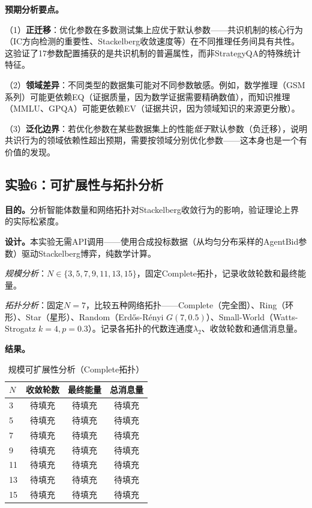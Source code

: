 \documentclass[12pt,a4paper,UTF8,fontset=fandol]{ctexart}
\begin{document}
\textbf{预期分析要点。}

（1）\textbf{正迁移}：优化参数在多数测试集上应优于默认参数——共识机制的核心行为（IC方向检测的重要性、Stackelberg收敛速度等）在不同推理任务间具有共性。这验证了17参数配置捕获的是共识机制的普遍属性，而非StrategyQA的特殊统计特征。

（2）\textbf{领域差异}：不同类型的数据集可能对不同参数敏感。例如，数学推理（GSM系列）可能更依赖EQ（证据质量，因为数学证据需要精确数值），而知识推理（MMLU、GPQA）可能更依赖EV（证据共识，因为领域知识的来源更分散）。

（3）\textbf{泛化边界}：若优化参数在某些数据集上的性能\textit{低于}默认参数（负迁移），说明共识行为的领域依赖性超出预期，需要按领域分别优化参数——这本身也是一个有价值的发现。

\subsection{实验6：可扩展性与拓扑分析}\label{sec:exp6}

\textbf{目的。}分析智能体数量和网络拓扑对Stackelberg收敛行为的影响，验证理论上界的实际松紧度。

\textbf{设计。}本实验无需API调用——使用合成投标数据（从均匀分布采样的AgentBid参数）驱动Stackelberg博弈，纯数学计算。

\textit{规模分析}：$N \in \{3, 5, 7, 9, 11, 13, 15\}$，固定Complete拓扑，记录收敛轮数和最终能量。

\textit{拓扑分析}：固定$N = 7$，比较五种网络拓扑——Complete（完全图）、Ring（环形）、Star（星形）、Random（Erd\H{o}s-R\'{e}nyi $G(7, 0.5)$）、Small-World（Watts-Strogatz $k=4, p=0.3$）。记录各拓扑的代数连通度$\lambda_2$、收敛轮数和通信消息量。

\textbf{结果。}

\begin{table}[H]
\centering
\caption{规模可扩展性分析（Complete拓扑）}\label{tab:exp6_scale}
\begin{tabular}{lccc}
\toprule
$N$ & 收敛轮数 & 最终能量 & 总消息量 \\
\midrule
3 & 待填充 & 待填充 & 待填充 \\
5 & 待填充 & 待填充 & 待填充 \\
7 & 待填充 & 待填充 & 待填充 \\
9 & 待填充 & 待填充 & 待填充 \\
11 & 待填充 & 待填充 & 待填充 \\
13 & 待填充 & 待填充 & 待填充 \\
15 & 待填充 & 待填充 & 待填充 \\
\bottomrule
\end{tabular}
\end{table}
\end{document}
